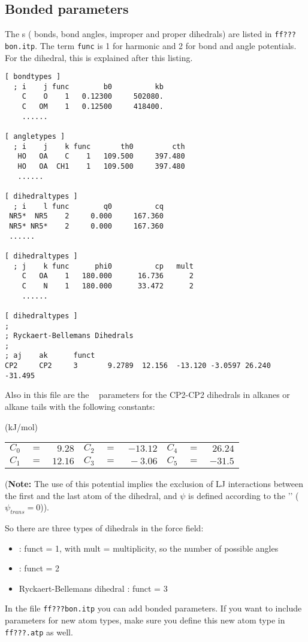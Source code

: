 \subsection{Bonded parameters}
\label{subsec:bondparam}
The s ({\ie} bonds, bond angles, improper and proper
dihedrals) are listed in {\tt ff???bon.itp}. The term {\tt func} is 1 for
harmonic and 2 for  bond and angle potentials.
For the dihedral, this is explained after this listing.
{\small\begin{verbatim}
[ bondtypes ]
  ; i    j func        b0          kb
    C    O    1   0.12300     502080.
    C   OM    1   0.12500     418400.
    ......

[ angletypes ]
  ; i    j    k func       th0         cth
   HO   OA    C    1   109.500     397.480
   HO   OA  CH1    1   109.500     397.480
   ......

[ dihedraltypes ]
  ; i    l func        q0          cq
 NR5*  NR5    2     0.000     167.360
 NR5* NR5*    2     0.000     167.360
 ......

[ dihedraltypes ]
  ; j    k func      phi0          cp   mult
    C   OA    1   180.000      16.736      2
    C    N    1   180.000      33.472      2
    ......

[ dihedraltypes ]
;
; Ryckaert-Bellemans Dihedrals
;
; aj    ak      funct
CP2     CP2     3       9.2789  12.156  -13.120 -3.0597 26.240  -31.495
\end{verbatim}}
Also in this file are the ~\cite{Ryckaert78} 
parameters for
the CP2-CP2 dihedrals in alkanes or alkane tails with the following
constants:

\begin{center}
(kJ/mol)\\
\begin{tabular}{llrllrllr}
$C_0$ & $=$ & $~ 9.28$ & $C_2$ & $=$ & $-13.12$ & $C_4$ & $=$ & $ 26.24$ \\
$C_1$ & $=$ & $ 12.16$ & $C_3$ & $=$ & $~-3.06$ & $C_5$ & $=$ & $-31.5 $ \\
\end{tabular}
\end{center}

({\bf Note:} The use of this potential implies the exclusion of LJ interactions
between the first and the last atom of the dihedral, and $\psi$ is defined
according to the '' ($\psi_{trans}=0$)).

So there are three types of dihedrals in the {\gromacs} force field:
\begin{itemize}
\item {} : funct = 1, with mult = multiplicity, so the
                                   number of possible angles
\item {} : funct = 2
\item Ryckaert-Bellemans dihedral : funct = 3
\end{itemize}
In the file {\tt ff???bon.itp} you can add bonded parameters. If you
want to include parameters for new atom types, make sure you define
this new atom type in {\tt ff???.atp} as well.

